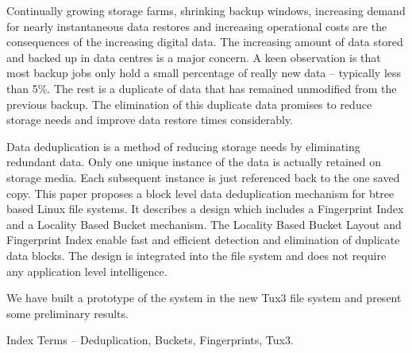 Continually growing storage farms, shrinking backup windows, increasing demand for nearly 
instantaneous data restores and increasing operational costs are the consequences 
of the increasing digital data. The increasing amount of data stored and backed up
in data centres is a major concern. A keen observation is that most backup jobs only 
hold a small percentage of really new data -- typically less than 5\%. The rest 
is a duplicate of data that has remained unmodified from the previous backup. 
The elimination of this duplicate data promises to reduce storage needs and 
improve data restore times considerably. 

Data deduplication is a method of reducing storage needs by eliminating redundant data. 
Only one unique instance of the data is actually retained on storage media. Each subsequent instance is just referenced back to the one saved copy. 
This paper proposes a block level data deduplication mechanism for btree based Linux file systems. 
It describes a design which includes a Fingerprint Index and a Locality Based Bucket mechanism. 
The Locality Based Bucket Layout and Fingerprint Index enable fast and efficient detection 
and elimination of duplicate data blocks. The design is integrated into the file system and 
does not require any application level intelligence.

We have built a prototype of the system in the new Tux3 file system and present some preliminary results. 

Index Terms -- Deduplication, Buckets, Fingerprints, Tux3.
